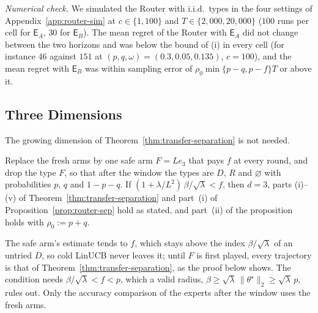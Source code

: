 \documentclass[anon]{alt2027} %
\newif\ifrevmarks\revmarkstrue
\newenvironment{revised}{\ifrevmarks\color{revcolor}\fi}{}
\newcommand{\rev}[1]{{\ifrevmarks\color{revcolor}\fi#1}}
\newcommand{\Exp}{\mathsf{E}}
\begin{document}
\emph{Numerical check.} We simulated the Router with i.i.d.\ types in the
four settings of Appendix~\ref{app:router-sim} at $c\in\{1,100\}$ and
$T\in\{2{,}000,20{,}000\}$ ($100$ runs per cell for $\Exp_A$, $30$ for
$\Exp_B$). The mean regret of the Router with $\Exp_A$ did not change between
the two horizons and was below the bound of (i) in every cell (for instance
$46$ against $151$ at $(p,q,\omega)=(0.3,0.05,0.135)$, $c=100$), and the mean
regret with $\Exp_B$ was within sampling error of $\rho_0\min\{p-q,p-f\}T$ or
above it.

\subsection{\rev{Three Dimensions}}
\label{app:proof-three-dim}

\begin{revised}
The growing dimension of Theorem~\ref{thm:transfer-separation} is not
needed.
\begin{corollary}
\label{cor:three-dim}
Replace the fresh arms by one safe arm $F=Le_3$ that pays $f$ at every
round, and drop the type $F$, so that after the window the types are $D$,
$R$ and $\varnothing$ with probabilities $p$, $q$ and $1-p-q$. If
$(1+\lambda/L^2)\,\beta/\sqrt\lambda<f$, then $d=3$, parts (i)--(v) of
Theorem~\ref{thm:transfer-separation} and part~(i) of
Proposition~\ref{prop:router-sep} hold as stated, and part~(ii) of the
proposition holds with $\rho_0:=p+q$.
\end{corollary}

The safe arm's estimate tends to $f$, which stays above the index
$\beta/\sqrt\lambda$ of an untried $D$, so cold LinUCB never leaves it;
until $F$ is first played, every trajectory is that of
Theorem~\ref{thm:transfer-separation}, as the proof below shows.
The condition needs $\beta/\sqrt\lambda<f<p$, which a valid radius,
$\beta\ge\sqrt\lambda\,\|\theta^\star\|_2\ge\sqrt\lambda\,p$, rules out. Only
the accuracy comparison of the experts after the window uses the fresh
arms.
\end{revised}
\end{document}
